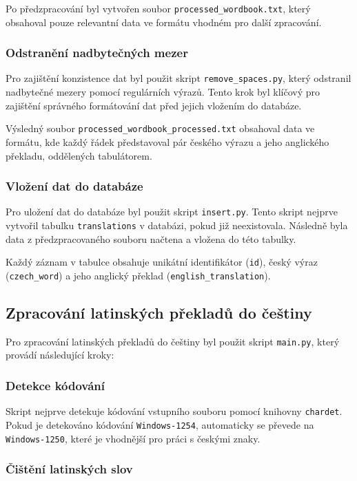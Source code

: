 \documentclass[czech, ba, kiv, he]{fasthesis}
\begin{document}
Po předzpracování byl vytvořen soubor \texttt{processed\_wordbook.txt}, který obsahoval pouze relevantní data ve formátu vhodném pro další zpracování.

\subsubsection*{Odstranění nadbytečných mezer}

Pro zajištění konzistence dat byl použit skript \texttt{remove\_spaces.py}, který odstranil nadbytečné mezery pomocí regulárních výrazů. Tento krok byl klíčový pro zajištění správného formátování dat před jejich vložením do databáze.

Výsledný soubor \texttt{processed\_wordbook\_processed.txt} obsahoval data ve formátu, kde každý řádek představoval pár českého výrazu a jeho anglického překladu, oddělených tabulátorem.

\subsubsection*{Vložení dat do databáze}

Pro uložení dat do databáze byl použit skript \texttt{insert.py}. Tento skript nejprve vytvořil tabulku \texttt{translations} v databázi, pokud již neexistovala. Následně byla data z předzpracovaného souboru načtena a vložena do této tabulky.

Každý záznam v tabulce obsahuje unikátní identifikátor (\texttt{id}), český výraz (\texttt{czech\_word}) a jeho anglický překlad (\texttt{english\_translation}).

\subsection{Zpracování latinských překladů do češtiny}

Pro zpracování latinských překladů do češtiny byl použit skript \texttt{main.py}, který provádí následující kroky:

\subsubsection*{Detekce kódování}

Skript nejprve detekuje kódování vstupního souboru pomocí knihovny \texttt{chardet}. Pokud je detekováno kódování \texttt{Windows-1254}, automaticky se převede na \texttt{Windows-1250}, které je vhodnější pro práci s českými znaky.

\subsubsection*{Čištění latinských slov}
\end{document}
